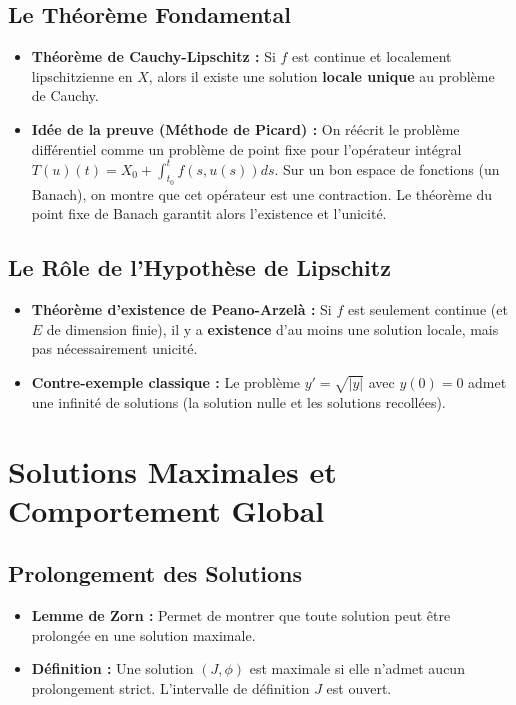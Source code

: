 \documentclass[12pt, a4paper, parskip=full]{report}
\theoremstyle{agregstyle}
\begin{document}
\subsection{Le Théorème Fondamental}
\begin{itemize}
    \item \textbf{Théorème de Cauchy-Lipschitz :} Si $f$ est continue et localement lipschitzienne en $X$, alors il existe une solution \textbf{locale unique} au problème de Cauchy.
    \item \textbf{Idée de la preuve (Méthode de Picard) :} On réécrit le problème différentiel comme un problème de point fixe pour l'opérateur intégral $T(u)(t) = X_0 + \int_{t_0}^t f(s, u(s))ds$. Sur un bon espace de fonctions (un Banach), on montre que cet opérateur est une contraction. Le théorème du point fixe de Banach garantit alors l'existence et l'unicité.
\end{itemize}

\subsection{Le Rôle de l'Hypothèse de Lipschitz}
\begin{itemize}
    \item \textbf{Théorème d'existence de Peano-Arzelà :} Si $f$ est seulement continue (et $E$ de dimension finie), il y a \textbf{existence} d'au moins une solution locale, mais pas nécessairement unicité.
    \item \textbf{Contre-exemple classique :} Le problème $y' = \sqrt{|y|}$ avec $y(0)=0$ admet une infinité de solutions (la solution nulle et les solutions recollées).
\end{itemize}

\section{Solutions Maximales et Comportement Global}
\subsection{Prolongement des Solutions}
\begin{itemize}
    \item \textbf{Lemme de Zorn :} Permet de montrer que toute solution peut être prolongée en une solution maximale.
    \item \textbf{Définition :} Une solution $(J, \phi)$ est maximale si elle n'admet aucun prolongement strict. L'intervalle de définition $J$ est ouvert.
\end{itemize}
\end{document}
